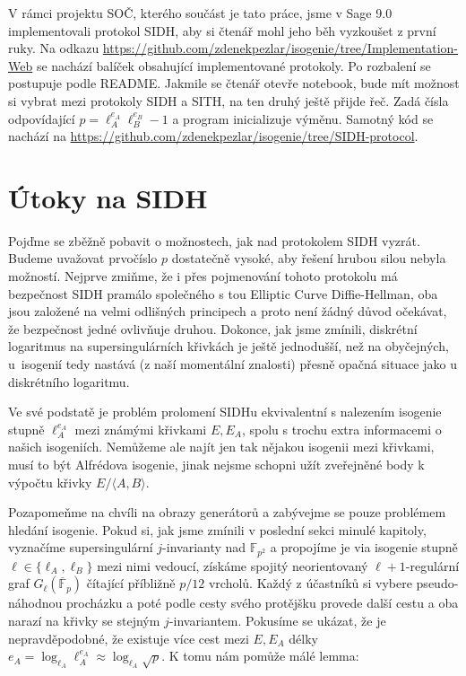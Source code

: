 \documentclass[12pt]{report}
\begin{document}
V rámci projektu SOČ, kterého součást je tato práce, jsme v Sage 9.0 implementovali protokol SIDH, aby si čtenář mohl jeho běh vyzkoušet z první ruky. Na odkazu \url{https://github.com/zdenekpezlar/isogenie/tree/Implementation-Web} se nachází balíček obsahující implementované protokoly. Po rozbalení se postupuje podle README. Jakmile se čtenář otevře notebook, bude mít možnost si vybrat mezi protokoly SIDH a SITH, na ten druhý ještě přijde řeč. Zadá čísla odpovídající $p = \ell_A ^{e_A} \ell_B ^{e_B} - 1$ a program inicializuje výměnu. Samotný kód se nachází na \url{https://github.com/zdenekpezlar/isogenie/tree/SIDH-protocol}.

\section{Útoky na SIDH}

Pojďme se zběžně pobavit o možnostech, jak nad protokolem SIDH vyzrát. Budeme uvažovat prvočíslo $p$ dostatečně vysoké, aby řešení hrubou silou nebyla možností. Nejprve zmiňme, že i přes pojmenování tohoto protokolu má bezpečnost SIDH pramálo společného s tou Elliptic Curve Diffie-Hellman, oba jsou založené na velmi odlišných principech a proto není žádný důvod očekávat, že bezpečnost jedné ovlivňuje druhou. Dokonce, jak jsme zmínili, diskrétní logaritmus na supersingulárních křivkách je ještě jednodušší, než na obyčejných, u~isogenií tedy nastává (z naší momentální znalosti) přesně opačná situace jako u diskrétního logaritmu.

Ve své podstatě je problém prolomení SIDHu ekvivalentní s nalezením isogenie stupně $\ell_A ^{e_A}$ mezi známými křivkami $E,E_A$, spolu s trochu extra informacemi o našich isogeniích. Nemůžeme ale najít jen tak nějakou isogenii mezi křivkami, musí to být Alfrédova isogenie, jinak nejsme schopni užít zveřejněné body k výpočtu křivky $E/\langle A,B \rangle$.

Pozapomeňme na chvíli na obrazy generátorů a zabývejme se pouze problémem hledání isogenie. Pokud si, jak jsme zmínili v poslední sekci minulé kapitoly, vyznačíme supersingulární $j$-invarianty nad $\mathbb{F}_{p^2}$ a propojíme je via isogenie stupně $\ell \in \lbrace \ell_A, \ell_B \rbrace$  mezi nimi vedoucí, získáme spojitý neorientovaný $\ell+1$-regulární graf $G_{\ell} (\overline{\mathbb{F}}_p)$ čítající příbližně $p/12$ vrcholů. Každý z účastníků si vybere pseudo-náhodnou procházku a poté podle cesty svého protějšku provede další cestu a oba narazí na křivky se stejným $j$-invariantem. Pokusíme se ukázat, že je nepravděpodobné, že existuje více cest mezi $E,E_A$ délky $e_A = \log_{\ell_A} \ell_A ^{e_A} \approx \log_{\ell_A} \sqrt{p}$. K tomu nám pomůže málé lemma:
\end{document}
